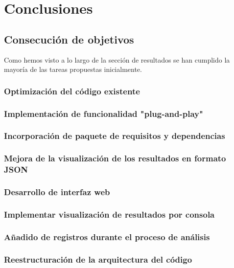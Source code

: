 \documentclass[a4paper, 12pt]{book}
\begin{document}
\cleardoublepage
\chapter{Conclusiones}
\label{chap:conclusiones}


\section{Consecución de objetivos}
\label{sec:consecucion-objetivos}

Como hemos visto a lo largo de la sección de resultados se han cumplido la mayoría de las tareas propuestas inicialmente. 

\subsection{Optimización del código existente}

\subsection{Implementación de funcionalidad "plug-and-play"}

\subsection{Incorporación de paquete de requisitos y dependencias}

\subsection{Mejora de la visualización de los resultados en formato JSON}

\subsection{Desarrollo de interfaz web}

\subsection{Implementar visualización de resultados por consola}

\subsection{Añadido de registros durante el proceso de análisis}

\subsection{Reestructuración de la arquitectura del código}
\end{document}

